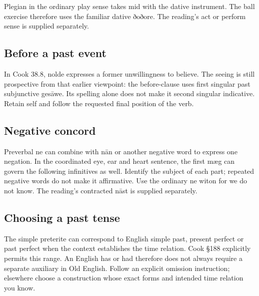 Plegian in the ordinary play sense takes mid with the dative instrument. The ball exercise therefore uses the familiar dative ðoðore. The reading’s act or perform sense is supplied separately.

\subsection*{Before a past event}

In Cook 38.8, nolde expresses a former unwillingness to believe. The seeing is still prospective from that earlier viewpoint: the before-clause uses first singular past subjunctive gesāwe. Its spelling alone does not make it second singular indicative. Retain self and follow the requested final position of the verb.

\subsection*{Negative concord}

Preverbal ne can combine with nān or another negative word to express one negation. In the coordinated eye, ear and heart sentence, the first mæg can govern the following infinitives as well. Identify the subject of each part; repeated negative words do not make it affirmative. Use the ordinary ne witon for we do not know. The reading’s contracted nāst is supplied separately.

\subsection*{Choosing a past tense}

The simple preterite can correspond to English simple past, present perfect or past perfect when the context establishes the time relation. Cook §188 explicitly permits this range. An English has or had therefore does not always require a separate auxiliary in Old English. Follow an explicit omission instruction; elsewhere choose a construction whose exact forms and intended time relation you know.

